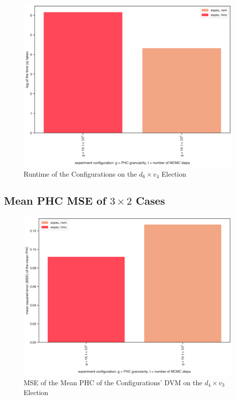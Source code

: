 \begin{figure}[ht]\centering
 \includegraphics[width=0.75\linewidth]{figures/6_4_time.png}
 \caption{Runtime of the Configurations on the $d_6 \times v_4$ Election}
 \label{fig:6_4_time}
\end{figure}

\FloatBarrier
\subsection{Mean PHC MSE of $3 \times 2$ Cases}

\begin{figure}[ht]\centering
 \includegraphics[width=0.75\linewidth]{figures/4_3_mean_mse.png}
 \caption{MSE of the Mean PHC of the Configurations' DVM on the $d_4 \times v_3$ Election}
 \label{fig:4_3_mean_mse}
\end{figure}

